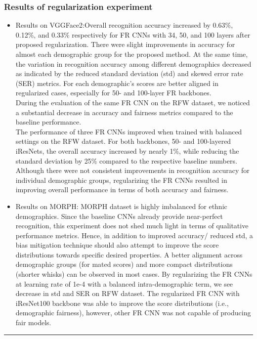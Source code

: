 \documentclass[12pt]{article}
\begin{document}
\subsubsection{Results of regularization experiment}
\begin{itemize}
  \item Results on VGGFace2:Overall recognition accuracy increased by 0.63\%, 0.12\%, and 0.33\% respectively
  for FR CNNs with 34, 50, and 100 layers after proposed
  regularization. There were slight improvements in accuracy for almost each demographic group for the proposed
  method. At the same time, the variation in recognition accuracy among different demographics decreased as indicated
  by the reduced standard deviation (std) and skewed error
  rate (SER) metrics. For each demographic's scores are better aligned in regularized cases, especially for 50- and 100-layer FR backbones.\\
  During the evaluation of the same FR CNN on the RFW dataset, we noticed a substantial decrease in accuracy
  and fairness metrics compared to the baseline performance.\\
  The performance of three FR CNNs improved when
trained with balanced settings on the RFW dataset. For
both backbones, 50- and 100-layered iResNets, the overall
accuracy increased by nearly 1\%, while reducing the standard deviation by 25\% compared to the respective baseline
numbers. Although there were not consistent improvements
in recognition accuracy for individual demographic groups,
regularizing the FR CNNs resulted in improving overall
performance in terms of both accuracy and fairness.\\
  \item Results on MORPH: MORPH
  dataset is highly imbalanced for ethnic demographics. Since the baseline CNNs already provide near-perfect
  recognition, this experiment does not shed much light in
  terms of qualitative performance metrics. Hence, in addition
  to improved accuracy/ reduced std, a bias mitigation technique should also attempt to improve the score distributions
  towards specific desired properties. A better alignment across demographic
  groups (for mated scores) and more compact distributions
  (shorter whisks) can be observed in most cases. By regularizing the FR CNNs at learning rate of 1e-4
  with a balanced intra-demographic term, we see decrease in std and
  SER on RFW dataset. The regularized FR CNN
  with iResNet100 backbone was able to improve the score
  distributions (i.e., demographic fairness), however, other
  FR CNN was not capable of producing fair models.
\end{itemize}
\hrule height 2pt \relax 
\end{document}
